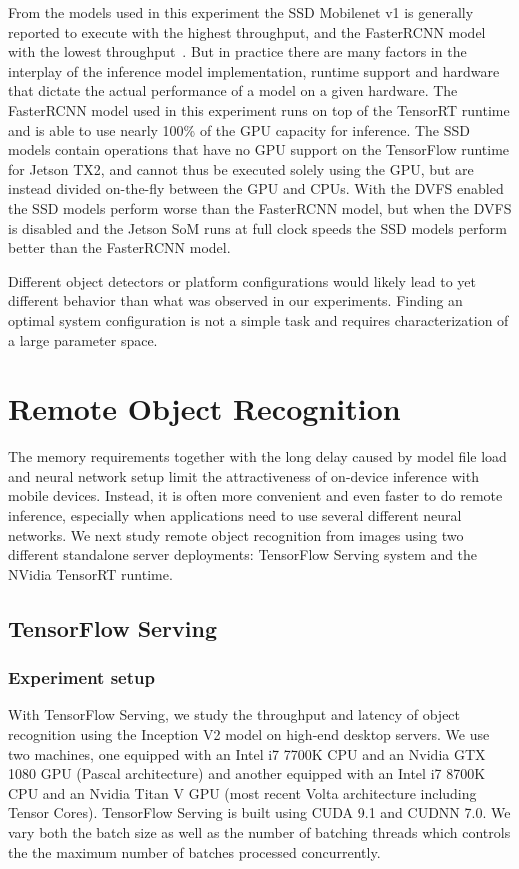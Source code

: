 \documentclass[sigconf]{acmart}
\begin{document}
From the models used in this experiment the SSD Mobilenet v1 is generally reported to execute with the highest throughput, and the FasterRCNN model with the lowest throughput~\cite{Huang2017CVPR}. But in practice there are many factors in the interplay of the inference model implementation, runtime support and hardware that dictate the actual performance of a model on a given hardware. The FasterRCNN model used in this experiment runs on top of the TensorRT runtime and is able to use nearly 100\% of the GPU capacity for inference. The SSD models contain operations that have no GPU support on the TensorFlow runtime for Jetson TX2, and cannot thus be executed solely using the GPU, but are instead divided on-the-fly between the GPU and CPUs. With the DVFS enabled the SSD models perform worse than the FasterRCNN model, but when the DVFS is disabled and the Jetson SoM runs at full clock speeds the SSD models perform better than the FasterRCNN model.

Different object detectors or platform configurations would likely lead to yet different behavior than what was observed in our experiments. Finding an optimal system configuration is not a simple task and requires characterization of a large parameter space.


\section{Remote Object Recognition}\label{sec:remote}

The memory requirements together with the long delay caused by model file load and neural network setup limit the attractiveness of on-device inference with mobile devices. Instead, it is often more convenient and even faster to do remote inference, especially when applications need to use several different neural networks. We next study remote object recognition from images using two different standalone server deployments: TensorFlow Serving system and the NVidia TensorRT runtime.

\subsection{TensorFlow Serving}\subsubsection{Experiment setup}
With TensorFlow Serving, we study the throughput and latency of object recognition using the Inception V2 model on high-end desktop servers. We use two machines, one equipped with an Intel i7 7700K CPU and an Nvidia GTX 1080 GPU (Pascal architecture) and another equipped with an Intel i7 8700K CPU and an Nvidia Titan V GPU (most recent Volta architecture including Tensor Cores). TensorFlow Serving is built using CUDA 9.1 and CUDNN 7.0. We vary both the batch size as well as the number of batching threads which controls the the maximum number of batches processed concurrently.
\end{document}
